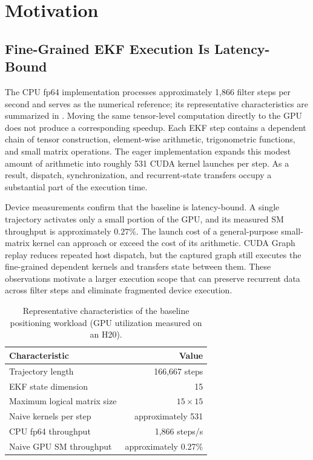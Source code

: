 \section{Motivation}
\label{sec:motivation}

\subsection{Fine-Grained EKF Execution Is Latency-Bound}
\label{subsec:motivation-latency}

The CPU fp64 implementation processes approximately 1,866 filter steps per second and serves as the numerical reference; its representative characteristics are summarized in . Moving the same tensor-level computation directly to the GPU does not produce a corresponding speedup. Each EKF step contains a dependent chain of tensor construction, element-wise arithmetic, trigonometric functions, and small matrix operations. The eager implementation expands this modest amount of arithmetic into roughly 531 CUDA kernel launches per step. As a result, dispatch, synchronization, and recurrent-state transfers occupy a substantial part of the execution time.

Device measurements confirm that the baseline is latency-bound. A single trajectory activates only a small portion of the GPU, and its measured SM throughput is approximately $0.27\%$. The launch cost of a general-purpose small-matrix kernel can approach or exceed the cost of its arithmetic. CUDA Graph replay reduces repeated host dispatch, but the captured graph still executes the fine-grained dependent kernels and transfers state between them. These observations motivate a larger execution scope that can preserve recurrent data across filter steps and eliminate fragmented device execution.

\begin{table}[H]
  \centering
  \caption{Representative characteristics of the baseline positioning workload (GPU utilization measured on an H20).}
  \label{tab:baseline-characteristics}
  \begin{tabular}{@{}lr@{}}
    \toprule
    Characteristic & Value \\
    \midrule
    Trajectory length & 166,667 steps \\
    EKF state dimension & 15 \\
    Maximum logical matrix size & $15\times15$ \\
    Naive kernels per step & approximately 531 \\
    CPU fp64 throughput & 1,866 steps/s \\
    Naive GPU SM throughput & approximately 0.27\% \\
    \bottomrule
  \end{tabular}
\end{table}

